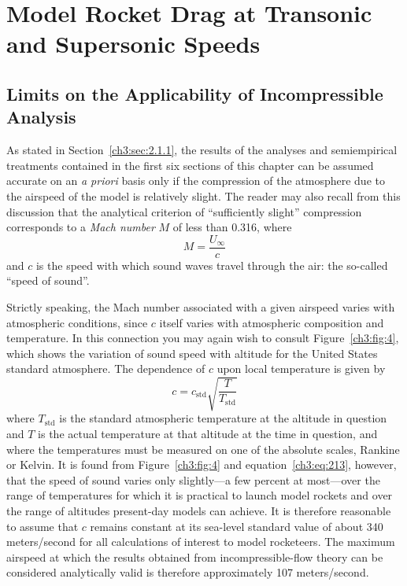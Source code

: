 \section{Model Rocket Drag at Transonic and Supersonic Speeds}\label{ch3:sec:7}

\subsection{Limits on the Applicability of Incompressible Analysis}\label{ch3:sec:7.1}

As stated in Section~\ref{ch3:sec:2.1.1}, the results of the analyses
and semiempirical treatments contained in the first six sections
of this chapter can be assumed accurate on an \emph{a priori} basis
only if the compression of the atmosphere due to the airspeed
of the model is relatively slight. The reader may also recall
from this discussion that the analytical criterion of ``sufficiently
slight'' compression corresponds to a \emph{Mach number} $M$ of less than
0.316, where
\begin{equation}\label{ch3:eq:212}
M = \frac{U_\infty}{c}
\end{equation}
and $c$ is the speed with which sound waves travel through the
air: the so-called ``speed of sound''.

Strictly speaking, the Mach number associated with a given
airspeed varies with atmospheric conditions, since $c$ itself
varies with atmospheric composition and temperature. In this
connection you may again wish to consult Figure~\ref{ch3:fig:4}, which shows
the variation of sound speed with altitude for the United States
standard atmosphere. The dependence of $c$ upon local temperature
is given by
\begin{equation}\label{ch3:eq:213}
c = c_{\mathrm{std}}\sqrt{\frac{T}{T_{\mathrm{std}}}}
\end{equation}
where $T_{\mathrm{std}}$ is the standard atmospheric temperature at the altitude
in question and $T$ is the actual temperature at that altitude
at the time in question, and where the temperatures must be
measured on one of the absolute scales, Rankine or Kelvin.
It is found from Figure~\ref{ch3:fig:4} and equation~\eqref{ch3:eq:213}, however, that
the speed of sound varies only slightly---a few percent at
most---over the range of temperatures for which it is practical
to launch model rockets and over the range of altitudes present-day
models can achieve. It is therefore reasonable to assume
that $c$ remains constant at its sea-level standard value of
about 340 meters/second for all calculations of interest to
model rocketeers. The maximum airspeed at which the results
obtained from incompressible-flow theory can be considered
analytically valid is therefore approximately 107 meters/second.

